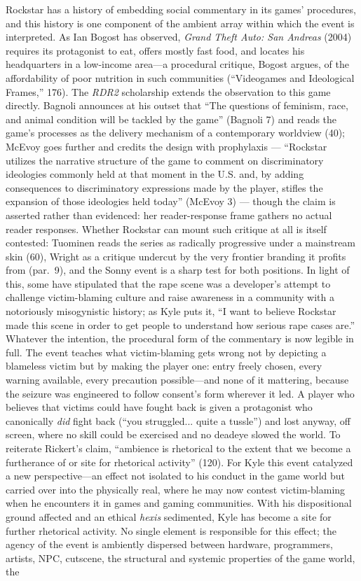 Rockstar has a history of embedding social commentary in its games' procedures, and this history is one component of the ambient array within which the event is interpreted. As Ian Bogost has observed, \textit{Grand Theft Auto: San Andreas} (2004) requires its protagonist to eat, offers mostly fast food, and locates his headquarters in a low-income area---a procedural critique, Bogost argues, of the affordability of poor nutrition in such communities (``Videogames and Ideological Frames,'' 176).
The \textit{RDR2} scholarship extends the observation to this game directly. Bagnoli announces at his outset that ``The questions of feminism, race, and animal condition will be tackled by the game'' (Bagnoli 7) and reads the game's processes as the delivery mechanism of a contemporary worldview (40); McEvoy goes further and credits the design with prophylaxis — ``Rockstar utilizes the narrative structure of the game to comment on discriminatory ideologies commonly held at that moment in the U.S. and, by adding consequences to discriminatory expressions made by the player, stifles the expansion of those ideologies held today'' (McEvoy 3) — though the claim is asserted rather than evidenced: her reader-response frame gathers no actual reader responses. Whether Rockstar can mount such critique at all is itself contested: Tuominen reads the series as radically progressive under a mainstream skin (60), Wright as a critique undercut by the very frontier branding it profits from (par.\ 9), and the Sonny event is a sharp test for both positions. In light of this, some have stipulated that the rape scene was a developer's attempt to challenge victim-blaming culture and raise awareness in a community with a notoriously misogynistic history; as Kyle puts it, ``I want to believe Rockstar made this scene in order to get people to understand how serious rape cases are.'' Whatever the intention, the procedural form of the commentary is now legible in full. The event teaches what victim-blaming gets wrong not by depicting a blameless victim but by making the player one: entry freely chosen, every warning available, every precaution possible---and none of it mattering, because the seizure was engineered to follow consent's form wherever it led. A player who believes that victims could have fought back is given a protagonist who canonically \textit{did} fight back (``you struggled... quite a tussle'') and lost anyway, off screen, where no skill could be exercised and no deadeye slowed the world. To reiterate Rickert's claim, ``ambience is rhetorical to the extent that we become a furtherance of or site for rhetorical activity'' (120). For Kyle this event catalyzed a new perspective---an effect not isolated to his conduct in the game world but carried over into the physically real, where he may now contest victim-blaming when he encounters it in games and gaming communities. With his dispositional ground affected and an ethical \textit{hexis} sedimented, Kyle has become a site for further rhetorical activity. No single element is responsible for this effect; the agency of the event is ambiently dispersed between hardware, programmers, artists, NPC, cutscene, the structural and systemic properties of the game world, the 